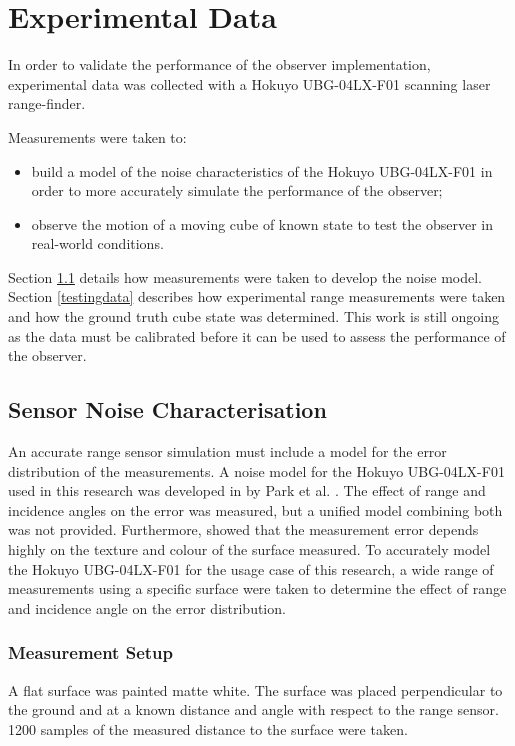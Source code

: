 \chapter{Experimental Data}
In order to validate the performance of the observer implementation, experimental data was collected with a Hokuyo UBG-04LX-F01 scanning laser range-finder.

Measurements were taken to:
\begin{itemize}
\item build a model of the noise characteristics of the Hokuyo UBG-04LX-F01 in order to more accurately simulate the performance of the observer;
\item observe the motion of a moving cube of known state to test the observer in real-world conditions.
\end{itemize}

Section \ref{sensor_noise} details how measurements were taken to develop the noise model.
Section \ref{testingdata} describes how experimental range measurements were taken and how the ground truth cube state was determined. This work is still ongoing as the data must be calibrated before it can be used to assess the performance of the observer. 

\section{Sensor Noise Characterisation} \label{sensor_noise}
An accurate range sensor simulation must include a model for the error distribution of the measurements. A noise model for the Hokuyo UBG-04LX-F01 used in this research was developed in by Park et al. \cite{park2010characterization}. The effect of range and incidence angles on the error was measured, but a unified model combining both was not provided. Furthermore, \cite{park2010characterization} showed that the measurement error depends highly on the texture and colour of the surface measured. To accurately model the Hokuyo UBG-04LX-F01 for the usage case of this research, a wide range of measurements using a specific surface were taken to determine the effect of range and incidence angle on the error distribution.

	\subsection{Measurement Setup}
	A flat surface was painted matte white. The surface was placed perpendicular to the ground and at a known distance and angle with respect to the range sensor.
	1200 samples of the measured distance to the surface were taken.
	
